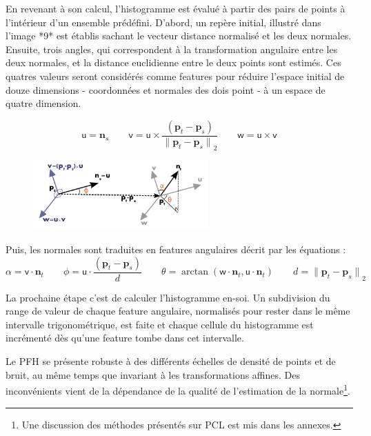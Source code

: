 En revenant à son calcul, l'histogramme est évalué à partir des pairs
de points à l'intérieur d’un ensemble prédéfini. D'abord, un repère
initial, illustré dans l'image *9* est établis sachant le vecteur distance normalisé et les deux
normales. Ensuite, trois angles, qui correspondent à la transformation
angulaire entre les deux normales, et la distance euclidienne entre le
deux points sont estimés. Ces quatres valeurs seront considérés comme
features pour réduire l’espace initial de douze dimensions - coordonnées
et normales des dois point - à un espace de quatre dimension.


\begin{equation*}
  {\mathsf u} = \boldsymbol{n}_s \qquad
  {\mathsf v} =  {\mathsf u} \times \frac{(\boldsymbol{p}_t-\boldsymbol{p}_s)}{{\|\boldsymbol{p}_t-\boldsymbol{p}_s\|}_{2}}  \qquad
  {\mathsf w} = {\mathsf u} \times {\mathsf v}
\end{equation*}

\begin{figure}[H]
  \centering
  \includegraphics[width=0.6\textwidth]{pfh_frame.png}
\end{figure}


Puis, les normales sont traduites en features angulaires décrit par les équations :
\begin{equation*}
  \alpha = {\mathsf v} \cdot \boldsymbol{n}_t  \qquad
  \phi   = {\mathsf u} \cdot \frac{(\boldsymbol{p}_t - \boldsymbol{p}_s)}{d} \qquad
  \theta = \arctan ({\mathsf w} \cdot \boldsymbol{n}_t, {\mathsf u} \cdot \boldsymbol{n}_t) \qquad
  d={\|\boldsymbol{p}_t-\boldsymbol{p}_s\|}_2 
\end{equation*}

La prochaine étape c'est de calculer l'histogramme en-soi. Un
subdivision du range de valeur de chaque feature angulaire, 
normalisés pour rester dans le même intervalle trigonométrique,
est faite et chaque cellule du histogramme est incrémenté dès
qu'une feature tombe dans cet intervalle. 

Le PFH se présente robuste à des différents échelles de densité de points et de bruit, au même temps que invariant à les transformations affines. Des inconvénients vient de la dépendance de la qualité de l'estimation de la normale\footnote{ Une discussion des méthodes présentés sur PCL est mis dans les annexes.}.

